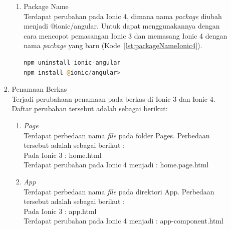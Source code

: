 \begin{enumerate}
\begin{enumerate}
\begin{enumerate}
\begin{enumerate}
				\item Package Name \\
				Terdapat perubahan pada Ionic 4, dimana nama {\it package} diubah menjadi @ionic/angular. Untuk dapat menggunakannya dengan cara mencopot pemasangan Ionic 3 dan memasang Ionic 4 dengan nama {\it package} yang baru (Kode~\ref{lst:packageNameIonic4}).
				\begin{lstlisting}[language=php, label={lst:packageNameIonic4}, caption=Pencopotan Ionic 3 dan Pemasangan Ionic 4 dengan nama {\it package} baru]
npm uninstall ionic-angular
npm install @ionic/angular>
				\end{lstlisting}
			\end{enumerate}

			\item Penamaan Berkas \\
			Terjadi perubahaan penamaan pada berkas di Ionic 3 dan Ionic 4. Daftar perubahan tersebut adalah sebagai berikut:
			\begin{enumerate}
				\item {\it Page} \\
				Terdapat perbedaan nama {\it file} pada folder Pages. Perbedaan tersebut adalah sebagai berikut :\\
				Pada Ionic 3 : home.html  \\
				Terdapat perubahan pada Ionic 4 menjadi : home.page.html
	
				\item {\it App} \\
				Terdapat perbedaan nama {\it file} pada direktori App. Perbedaan tersebut adalah sebagai berikut : \\
				Pada Ionic 3 : app.html \\
				Terdapat perubahan pada Ionic 4 menjadi : app-component.html
			\end{enumerate}




\end{enumerate}
\end{enumerate}
\end{enumerate}
